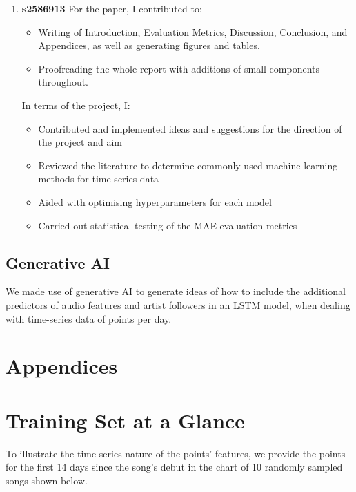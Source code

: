 \documentclass{article}
\begin{document}
\begin{enumerate}
    \item\textbf{s2586913}
    \newline For the paper, I contributed to:
  \begin{itemize}
  \item Writing of Introduction, Evaluation Metrics, Discussion, Conclusion, and Appendices, as well as generating figures and tables.
  \item Proofreading the whole report with additions of small components throughout.
  \end{itemize}
In terms of the project, I:
  \begin{itemize}
  \item Contributed and implemented ideas and suggestions for the direction of the project and aim
  \item Reviewed the literature to determine commonly used machine learning methods for time-series data
  \item Aided with optimising hyperparameters for each model
  \item Carried out statistical testing of the MAE evaluation metrics

  \end{itemize}
\end{enumerate}


\subsection{Generative AI}

We made use of generative AI to generate ideas of how to include the additional predictors of audio features and artist followers in an LSTM model, when dealing with time-series data of points per day.

\newpage
\section*{Appendices}

\appendix
\section{Training Set at a Glance}\label{A}

To illustrate the time series nature of the points' features, we provide the points for the first 14 days since the song's debut in the chart of 10 randomly sampled songs shown below.  
\end{document}
